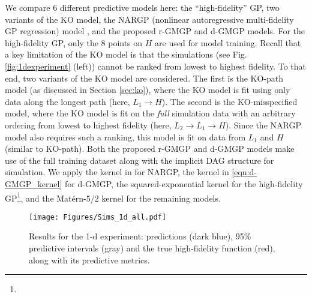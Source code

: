 \documentclass[12pt]{article}
\newcommand{\bs}[1]{\boldsymbol{#1}}
\newcommand{\cbl}[1]{{\color{black}{#1}}}
\newcommand{\cmtI}[1]{{\color{magenta} (Irene: #1)}}
\begin{document}
We compare 6 different predictive models here: the ``high-fidelity'' GP, two variants of the KO model, the NARGP (nonlinear autoregressive multi-fidelity GP regression) model \citep{Perdikaris_2017}, and the proposed r-GMGP and d-GMGP models. For the high-fidelity GP, only the 8 points on $H$ are used for model training. Recall that a key limitation of the KO model is that the simulations (see Fig. \ref{fig:1dexperiment} (left)) cannot be ranked from lowest to highest fidelity. To that end, two variants of the KO model are considered. The first is the KO-path model (as discussed in Section \ref{sec:ko}), where the KO model is fit using only data along the longest path (here, $L_1 \rightarrow H$). The second is the KO-misspecified model, where the KO model is fit on the \textit{full} simulation data with an arbitrary ordering from lowest to highest fidelity (here, $L_2 \rightarrow L_1 \rightarrow H$). Since the NARGP model also requires such a ranking, this model is fit on data from $L_1$ and $H$ (similar to KO-path). Both the proposed r-GMGP and d-GMGP models make use of the full training dataset along with the implicit DAG structure for simulation. We apply the kernel in \cite{Perdikaris_2017} for NARGP, the kernel in \eqref{eqn:d-GMGP_kernel} for d-GMGP, the squared-exponential kernel for the high-fidelity GP\footnote{\cbl{The fit with a Mat\'ern kernel here yielded poor results, hence our use of the squared-exponential kernel.}}, and the Mat\'ern-5/2 kernel for the remaining models.

\begin{figure}[!t]
    \centering
    \texttt{[image: Figures/Sims\_1d\_all.pdf]}
  \caption{Results for the 1-d experiment: predictions (dark blue), 95\% predictive intervals (gray) and the true high-fidelity function (red), along with its predictive metrics.}
  \label{fig:Example1d}
\end{figure}


\end{document}
